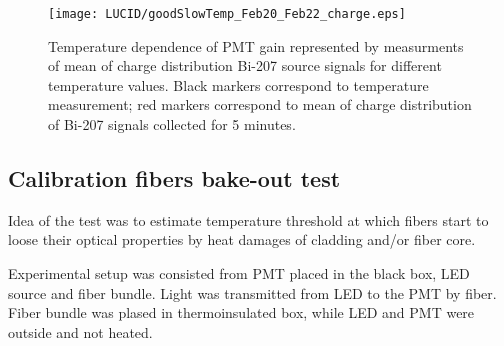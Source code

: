 \begin{figure}
\centering
\texttt{[image: LUCID/goodSlowTemp\_Feb20\_Feb22\_charge.eps]}
\caption{Temperature dependence of PMT gain represented by measurments of mean of charge distribution Bi-207 source signals for different temperature values.
Black markers correspond to temperature measurement; red markers correspond to mean of charge distribution of Bi-207 signals collected for 5 minutes.}
\label{fig:PMTChargeTempDep}
\end{figure}


\subsection{Calibration fibers bake-out test}

% 
% 
% 


Idea of the test was to estimate temperature threshold at which fibers start to loose their optical properties
by heat damages of cladding and/or fiber core.

Experimental setup was consisted from PMT placed in the black box, LED source and fiber bundle.
Light was transmitted from LED to the PMT by fiber.
Fiber bundle was plased in thermoinsulated box, while LED and PMT were outside and not heated.

